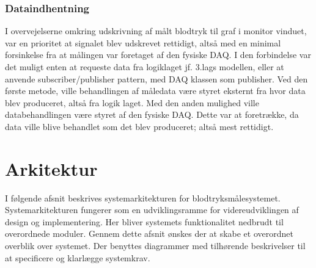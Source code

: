 \subsubsection{Dataindhentning}
I overvejelserne omkring udskrivning af målt blodtryk til graf i monitor vinduet, var en prioritet at signalet blev udskrevet rettidigt, altså med en minimal forsinkelse fra at målingen var foretaget af den fysiske DAQ. I den forbindelse var det muligt enten at requeste data fra logiklaget jf. 3.lags modellen, eller at anvende subscriber/publisher pattern, med DAQ klassen som publisher. Ved den første metode, ville behandlingen af måledata være styret eksternt fra hvor data blev produceret, altså fra logik laget. Med den anden mulighed ville databehandlingen være styret af den fysiske DAQ. Dette var at foretrække, da data ville blive behandlet som det blev produceret; altså mest rettidigt.


\section{Arkitektur}
I følgende afsnit beskrives systemarkitekturen for blodtryksmålesystemet. Systemarkitekturen fungerer som en udviklingsramme for videreudviklingen af design og implementering. Her bliver systemets funktionalitet nedbrudt til overordnede moduler. Gennem dette afsnit ønskes der at skabe et overordnet overblik over systemet. Der benyttes diagrammer med tilhørende beskrivelser til at specificere og klarlægge systemkrav.

